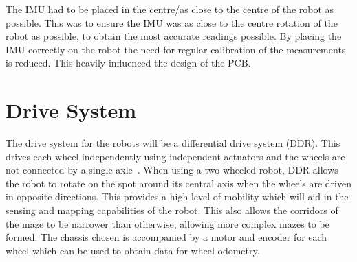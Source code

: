 The IMU had to be placed in the centre/as 
close to the centre of the robot as possible. This was to ensure the 
IMU was as close to the centre rotation of the robot as possible, to 
obtain the most accurate readings possible. By placing the IMU correctly 
on the robot the need for regular calibration of the measurements is 
reduced. This heavily influenced the design of the PCB. 


\section{Drive System}\label{mech/drive}

The drive system for the robots will be a differential drive system (DDR).
This drives each wheel independently using independent actuators and the
wheels are not connected by a single axle~\cite[p.~146]{braunl_embedded_2013}.
When using a two wheeled robot, DDR allows the
robot to rotate on the spot around its central axis when the wheels 
are driven in opposite directions. This provides a high level of 
mobility which will aid in the sensing and mapping capabilities of 
the robot. This also allows the corridors of the maze to be narrower 
than otherwise, allowing more complex mazes to be formed. The 
chassis chosen is accompanied by a motor and encoder for each wheel 
which can be used to obtain data for wheel odometry. 

